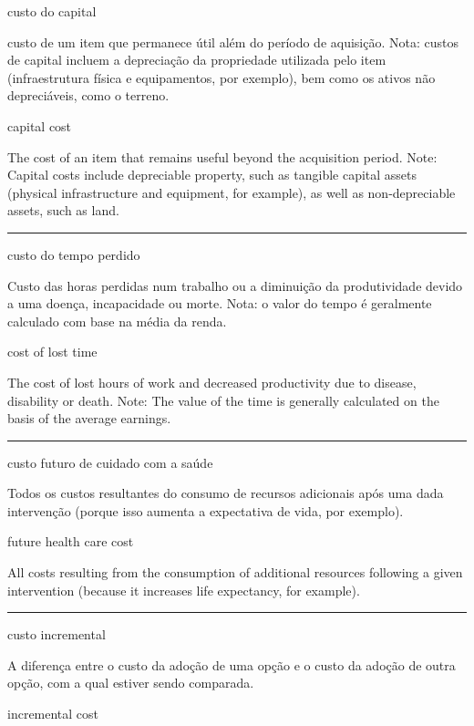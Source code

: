 \documentclass[
  openany]{book}
\begin{document}
custo do capital

custo de um item que permanece útil além do período de aquisição. Nota: custos de capital incluem a depreciação da propriedade utilizada pelo item (infraestrutura física e equipamentos, por exemplo), bem como os ativos não depreciáveis, como o terreno.

capital cost

The cost of an item that remains useful beyond the acquisition period. Note: Capital costs include depreciable property, such as tangible capital assets (physical infrastructure and equipment, for example), as well as non-depreciable assets, such as land.

\begin{center}\rule{0.5\linewidth}{0.5pt}\end{center}

custo do tempo perdido

Custo das horas perdidas num trabalho ou a diminuição da produtividade devido a uma doença, incapacidade ou morte. Nota: o valor do tempo é geralmente calculado com base na média da renda.

cost of lost time

The cost of lost hours of work and decreased productivity due to disease, disability or death. Note: The value of the time is generally calculated on the basis of the average earnings.

\begin{center}\rule{0.5\linewidth}{0.5pt}\end{center}

custo futuro de cuidado com a saúde

Todos os custos resultantes do consumo de recursos adicionais após uma dada intervenção (porque isso aumenta a expectativa de vida, por exemplo).

future health care cost

All costs resulting from the consumption of additional resources following a given intervention (because it increases life expectancy, for example).

\begin{center}\rule{0.5\linewidth}{0.5pt}\end{center}

custo incremental

A diferença entre o custo da adoção de uma opção e o custo da adoção de outra opção, com a qual estiver sendo comparada.

incremental cost
\end{document}
